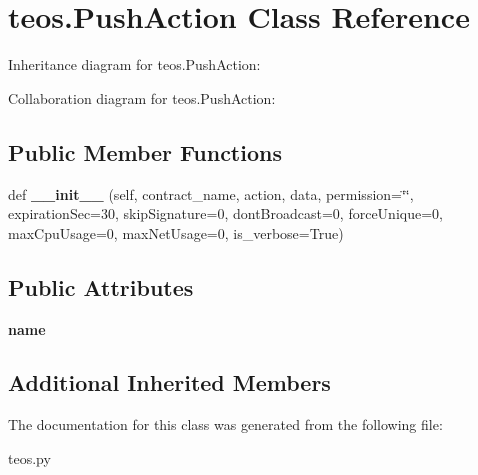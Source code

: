 \hypertarget{classteos_1_1PushAction}{}\section{teos.\+Push\+Action Class Reference}
\label{classteos_1_1PushAction}


Inheritance diagram for teos.\+Push\+Action\+:


Collaboration diagram for teos.\+Push\+Action\+:
\subsection*{Public Member Functions}
\begin{DoxyCompactItemize}
\item 
\mbox{\label{classteos_1_1PushAction_a2d9b7f7d5ac10e47e7e5ee80c1660b2c}} 
def {\bfseries \+\_\+\+\_\+init\+\_\+\+\_\+} (self, contract\+\_\+name, action, data, permission=\char`\"{}\char`\"{}, expiration\+Sec=30, skip\+Signature=0, dont\+Broadcast=0, force\+Unique=0, max\+Cpu\+Usage=0, max\+Net\+Usage=0, is\+\_\+verbose=True)
\end{DoxyCompactItemize}
\subsection*{Public Attributes}
\begin{DoxyCompactItemize}
\item 
\mbox{\label{classteos_1_1PushAction_ad4093b4b68524282b4e49429943e1dcc}} 
{\bfseries name}
\end{DoxyCompactItemize}
\subsection*{Additional Inherited Members}


The documentation for this class was generated from the following file\+:\begin{DoxyCompactItemize}
\item 
teos.\+py\end{DoxyCompactItemize}
